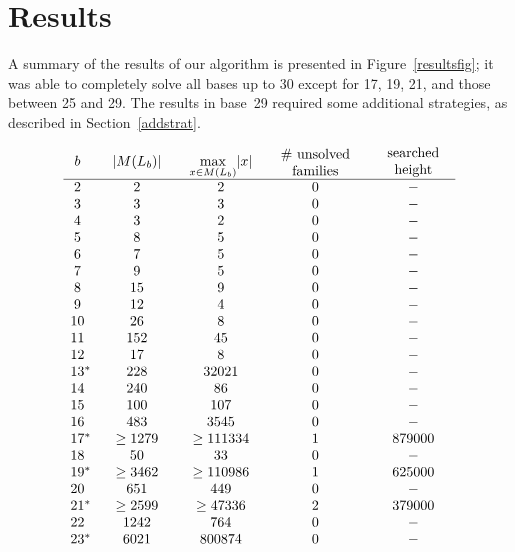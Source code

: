 \documentclass[12pt]{article}
\theoremstyle{plain}
\theoremstyle{definition}
\newcommand{\0}{\mathtt{0}}
\newcommand{\1}{\mathtt{1}}
\newcommand{\2}{\mathtt{2}}
\newcommand{\3}{\mathtt{3}}
\newcommand{\4}{\mathtt{4}}
\newcommand{\5}{\mathtt{5}}
\newcommand{\6}{\mathtt{6}}
\newcommand{\7}{\mathtt{7}}
\newcommand{\8}{\mathtt{8}}
\newcommand{\9}{\mathtt{9}}
\newcommand{\updated}[1]{{\color{red}#1}}
\renewcommand{\updated}[1]{#1}
\begin{document}
\section{Results}
A summary of the results of our algorithm is presented in 
Figure~\ref{resultsfig}; it was able to completely solve all bases up to 30 \updated{except for
17, 19, 21, and those between 25 and 29}.
The results in base~29 required some additional strategies, as described in Section~\ref{addstrat}.

\begin{figure}\[\begin{array}{c@{\qquad}c@{\qquad}c@{\qquad}c@{\qquad}c}
b & \lvert M(L_b)\rvert & \max\limits_{x\in M(L_b)}\lvert x\rvert & \parbox{5em}{\centering\# unsolved\\families} & \parbox{5em}{\centering searched height} \\ \hline
2 & 2 & 2 & 0 & - \\ 
3 & 3 & 3 & 0 & - \\ 
4 & 3 & 2 & 0 & - \\ 
5 & 8 & 5 & 0 & - \\ 
6 & 7 & 5 & 0 & - \\ 
7 & 9 & 5 & 0 & - \\ 
8 & 15 & 9 & 0 & - \\ 
9 & 12 & 4 & 0 & - \\ 
10 & 26 & 8 & 0 & - \\ 
11 & 152 & 45 & 0 & - \\ 
12 & 17 & 8 & 0 & - \\ 
13\mathrlap{^*} & 228 & 32021 & 0 & - \\ 
14 & 240 & 86 & 0 & - \\ 
15 & 100 & 107 & 0 & - \\ 
16 & 483 & 3545 & 0 & - \\ 
17\mathrlap{^*} & \geq1279 & \geq111334 & 1 & \updated{879000} \\ 
18 & 50 & 33 & 0 & - \\ 
19\mathrlap{^*} & \geq3462 & \geq110986 & 1 & \updated{625000} \\ 
20 & 651 & 449 & 0 & - \\ 
21\mathrlap{^*} & \geq2599 & \geq47336 & 2 & \updated{379000} \\ 
22 & 1242 & 764 & 0 & - \\ 
23\mathrlap{^*} & \updated{6021} & \updated{800874} & \updated{0} & \updated{-} \\ 

\end{array}\]
\end{figure}
\end{document}
